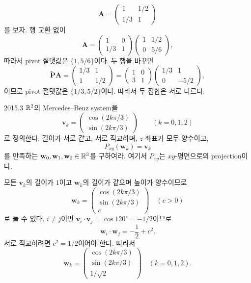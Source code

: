 \begin{solution}
\[
\mathbf A=
\begin{pmatrix}
1&1/2\\[2pt]
1/3&1
\end{pmatrix}
\]
를 보자. 행 교환 없이
\[
\mathbf A=
\begin{pmatrix}1&0\\1/3&1\end{pmatrix}
\begin{pmatrix}1&1/2\\0&5/6\end{pmatrix},
\]
따라서 pivot 절댓값은 $\{1,5/6\}$이다. 두 행을 바꾸면
\[
\widetilde{\mathbf P}\mathbf A=
\begin{pmatrix}1/3&1\\1&1/2\end{pmatrix}
=
\begin{pmatrix}1&0\\3&1\end{pmatrix}
\begin{pmatrix}1/3&1\\0&-5/2\end{pmatrix},
\]
이므로 pivot 절댓값은 $\{1/3,5/2\}$이다. 따라서 두 집합은 서로 다르다.
\end{solution}

\begin{pastproblem}{2015.3}
$\mathbb{R}^2$의 Mercedes--Benz system을
\[
\mathbf v_k=
\begin{pmatrix}
\cos(2k\pi/3)\\
\sin(2k\pi/3)
\end{pmatrix}
\qquad(k=0,1,2)
\]
로 정의한다. 길이가 서로 같고, 서로 직교하며, $z$-좌표가 모두 양수이고,
\[
P_{xy}(\mathbf w_k)=\mathbf v_k
\]
를 만족하는 $\mathbf w_0,\mathbf w_1,\mathbf w_2\in\mathbb{R}^3$를 구하여라. 여기서 $P_{xy}$는 $xy$-평면으로의 projection이다.
\end{pastproblem}

\begin{solution}
모든 $\mathbf v_k$의 길이가 $1$이고 $\mathbf w_k$의 길이가 같으며 높이가 양수이므로
\[
\mathbf w_k=
\begin{pmatrix}
\cos(2k\pi/3)\\
\sin(2k\pi/3)\\
c
\end{pmatrix}
\quad(c>0)
\]
로 둘 수 있다. $i\ne j$이면 $\mathbf v_i\cdot\mathbf v_j=\cos120^\circ=-1/2$이므로
\[
\mathbf w_i\cdot\mathbf w_j=-\frac12+c^2.
\]
서로 직교하려면 $c^2=1/2$이어야 한다. 따라서
\[
\boxed{
\mathbf w_k=
\begin{pmatrix}
\cos(2k\pi/3)\\
\sin(2k\pi/3)\\
1/\sqrt2
\end{pmatrix}
\quad(k=0,1,2)}.
\]
\end{solution}

